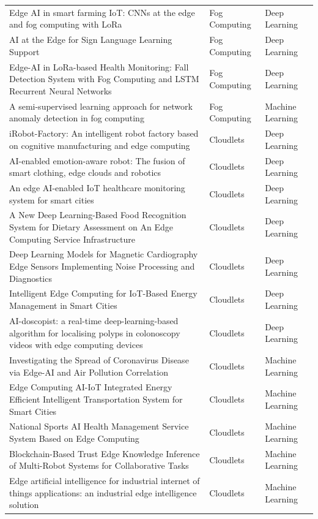 \begin{table}[h!]
{\begin{tabular}{lll}
Edge AI in smart farming IoT: CNNs at the edge and fog computing with LoRa \cite{gia2019edge} & Fog Computing & Deep Learning \\
AI at the Edge for Sign Language Learning Support \cite{battistoni2019ai} & Fog Computing & Deep Learning \\
Edge-AI in LoRa-based Health Monitoring: Fall Detection System with Fog Computing and LSTM Recurrent Neural Networks \cite{queralta2019edge} & Fog Computing & Deep Learning \\ \hline
A semi-supervised learning approach for network anomaly detection in fog computing \cite{xu2019semi} & Fog Computing & Machine Learning \\ \hline
iRobot-Factory: An intelligent robot factory based on cognitive manufacturing and edge computing \cite{hu2019irobot} & Cloudlets & Deep Learning \\
AI-enabled emotion-aware robot: The fusion of smart clothing, edge clouds and robotics \cite{yang2020ai} & Cloudlets & Deep Learning \\
An edge AI-enabled IoT healthcare monitoring system for smart cities \cite{rathi2021edge} & Cloudlets & Deep Learning \\
A New Deep Learning-Based Food Recognition System for Dietary Assessment on  An Edge Computing Service Infrastructure \cite{liu2017new} & Cloudlets & Deep Learning \\
Deep Learning Models for Magnetic Cardiography Edge Sensors Implementing Noise Processing and Diagnostics \cite{sakib2021deep} & Cloudlets & Deep Learning \\
Intelligent Edge Computing for IoT-Based Energy Management in Smart Cities \cite{liu2019intelligent} & Cloudlets & Deep Learning \\
AI-doscopist: a real-time deep-learning-based algorithm for localising polyps in colonoscopy videos with edge computing devices \cite{poon2020ai} & Cloudlets & Deep Learning \\ \hline
Investigating the Spread of Coronavirus Disease via Edge-AI and Air Pollution Correlation \cite{gomathy2021investigating} & Cloudlets & Machine Learning \\
Edge Computing AI-IoT Integrated Energy Efficient Intelligent Transportation System for Smart Cities \cite{chavhan2022edge} & Cloudlets & Machine Learning \\
National Sports AI Health Management Service System Based on Edge Computing \cite{yang2021national} & Cloudlets & Machine Learning \\
Blockchain-Based Trust Edge Knowledge Inference of Multi-Robot Systems for Collaborative Tasks \cite{li2021blockchain} & Cloudlets & Machine Learning \\
Edge artificial intelligence for industrial internet of things applications: an industrial edge intelligence solution \cite{foukalas2021edge} & Cloudlets & Machine Learning \\ \hline
\end{tabular}%
}
\end{table}


